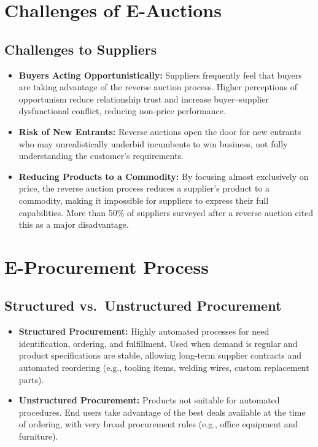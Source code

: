 \documentclass[12pt,a4paper]{article}
\begin{document}
\section{Challenges of E-Auctions}

\subsection{Challenges to Suppliers}
\begin{itemize}
    \item \textbf{Buyers Acting Opportunistically:} Suppliers frequently feel that buyers are taking advantage of the reverse auction process. Higher perceptions of opportunism reduce relationship trust and increase buyer--supplier dysfunctional conflict, reducing non-price performance.
    \item \textbf{Risk of New Entrants:} Reverse auctions open the door for new entrants who may unrealistically underbid incumbents to win business, not fully understanding the customer's requirements.
    \item \textbf{Reducing Products to a Commodity:} By focusing almost exclusively on price, the reverse auction process reduces a supplier's product to a commodity, making it impossible for suppliers to express their full capabilities. More than 50\% of suppliers surveyed after a reverse auction cited this as a major disadvantage.
\end{itemize}

\section{E-Procurement Process}

\subsection{Structured vs.\ Unstructured Procurement}

\begin{itemize}
    \item \textbf{Structured Procurement:} Highly automated processes for need identification, ordering, and fulfillment. Used when demand is regular and product specifications are stable, allowing long-term supplier contracts and automated reordering (e.g., tooling items, welding wires, custom replacement parts).
    \item \textbf{Unstructured Procurement:} Products not suitable for automated procedures. End users take advantage of the best deals available at the time of ordering, with very broad procurement rules (e.g., office equipment and furniture).
\end{itemize}
\end{document}
